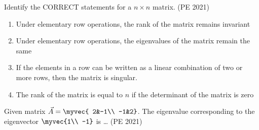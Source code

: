 \item Identify the {CORRECT} statements for a $n\times n$ matrix.
\hfill{(PE 2021)}
\begin{enumerate}
    \item Under elementary row operations, the rank of the matrix remains invariant
    \item Under elementary row operations, the eigenvalues of the matrix remain the same
    \item  If the elements in a row can be written as a linear combination of two or more rows, then the matrix is singular.
    \item The rank of the matrix is equal to $n$ if the determinant of the matrix is zero
\end{enumerate}
\item Given matrix $\vec{A}=\myvec{
2&-1\\
-1&2}$. The eigenvalue corresponding to the eigenvector $\myvec{1\\
-1}$ is \dots 
\hfill{(PE 2021)}

